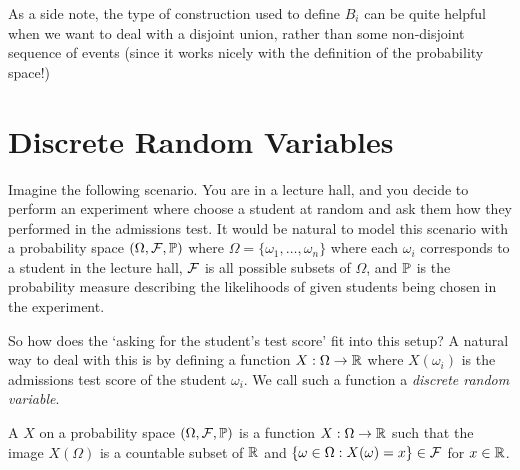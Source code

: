 \documentclass[10pt, a4paper]{article}
\begin{document}
As a side note, the type of construction used to define $B_i$ can be quite helpful when we want to deal with a disjoint union, rather than some non-disjoint sequence of events (since it works nicely with the definition of the probability space!)




\section{Discrete Random Variables}

Imagine the following scenario. You are in a lecture hall, and you decide to perform an experiment where choose a student at random and ask them how they performed in the admissions test. It would be natural to model this scenario with a probability space $(\Omega, \mathcal{F}, \mathbb{P})$ where $\Omega = \{\omega_1, \dots, \omega_n\}$ where each $\omega_i$ corresponds to a student in the lecture hall, $\mathcal{F}$ is all possible subsets of $\Omega$, and $\mathbb{P}$ is the probability measure describing the likelihoods of given students being chosen in the experiment.

So how does the `asking for the student's test score' fit into this setup? A natural way to deal with this is by defining a function $X : \Omega \rightarrow \mathbb{R}$ where $X(\omega_i)$ is the admissions test score of the student $\omega_i$. We call such a function a \emph{discrete random variable}. 

\begin{definition}
	A  $X$ on a probability space $(\Omega, \mathcal{F}, \mathbb{P})$ is a function $X : \Omega \rightarrow \mathbb{R}$ such that the image $X(\Omega)$ is a countable subset of $\mathbb{R}$ and $\{ \omega \in \Omega : X(\omega) = x \} \in \mathcal{F}$ for $x \in \mathbb{R}$.
\end{definition}
\end{document}
